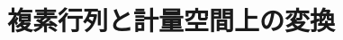 \documentclass[../../topic_linear-algebra]{subfiles}
\begin{document}
\chapter{複素行列と計量空間上の変換}






\end{document}
